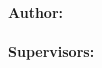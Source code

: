 \begin{titlepage}
\begin{minipage}{\textwidth}
{\Large \textbf{Author:}\\[0.3cm]
{\Large  \myName}}\\[1.4cm]


{\large \textbf{Supervisors:}}\\[0.3cm]
{\large \myProf\\
\myOtherProf\\ [1cm]}

\vspace{0.3cm}
{\normalsize  \myProgram } \\ [0.7cm]


{\small \myTime}


		
\end{minipage}

\end{titlepage}



